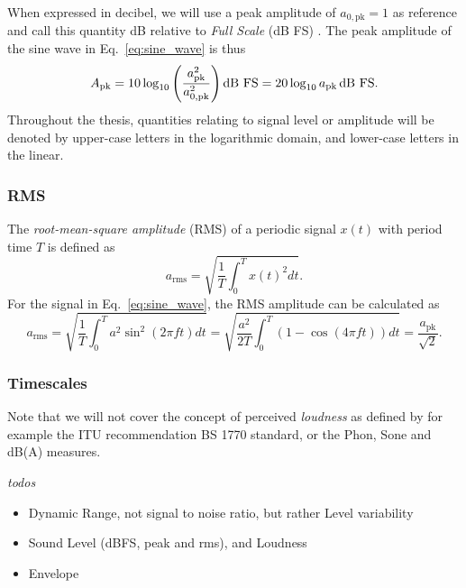 \documentclass[../main2.tex]{subfiles}
\begin{document}
When expressed in decibel, we will use a peak amplitude of $a_{0, \text{pk}} = 1$ as reference and call this quantity dB relative to \emph{Full Scale} (dB FS) \cite{XXXX}. The peak amplitude of the sine wave in Eq.~\eqref{eq:sine_wave} is thus
\begin{equation}
A_\text{pk} = 10 \log_{10} \left( \frac{a_\text{pk}^2}{a_{0, \text{pk}}^2} \right) \text{dB FS} = 20 \log_{10} a_\text{pk} \mskip3mu\text{dB FS}.
\end{equation}
Throughout the thesis, quantities relating to signal level or amplitude will be denoted by upper-case letters in the logarithmic domain, and lower-case letters in the linear.



\subsubsection{RMS}
The \emph{root-mean-square amplitude} (RMS) of a periodic signal $x(t)$ with period time $T$ is defined as
\begin{equation}
a_\text{rms} = \sqrt{ \frac{1}{T} \int_{0}^{T} x(t)^2 dt }.
\end{equation}
For the signal in Eq.~\eqref{eq:sine_wave}, the RMS amplitude can be calculated as
\begin{equation}
a_\text{rms} =
\sqrt{ \frac{1}{T} \int_{0}^{T} a^2 \sin^2 (2 \pi f t) dt } =
\sqrt{ \frac{a^2}{2T} \int_{0}^{T}\left( 1 - \cos (4 \pi f t) \right) dt } =
\frac{a_\text{pk}}{\sqrt 2}.
\end{equation}


\subsubsection{Timescales}
Note that we will not cover the concept of perceived \emph{loudness} as defined by for example the ITU recommendation BS 1770 standard, or the Phon, Sone and dB(A) measures.

\emph{todos}
\begin{itemize}
	\item Dynamic Range, not signal to noise ratio, but rather Level variability
	\item Sound Level (dBFS, peak and rms), and Loudness
	\item Envelope
\end{itemize}
\end{document}
